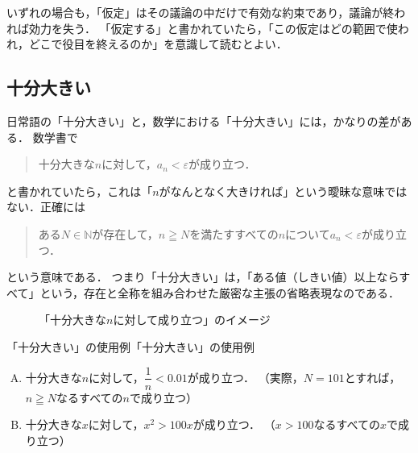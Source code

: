 いずれの場合も，「仮定」はその議論の中だけで有効な約束であり，議論が終われば効力を失う．
「仮定する」と書かれていたら，「この仮定はどの範囲で使われ，どこで役目を終えるのか」を意識して読むとよい．

\subsection{十分大きい}

日常語の「十分大きい」と，数学における「十分大きい」には，かなりの差がある．
数学書で
\begin{quote}
  十分大きな$n$に対して，$a_n < \varepsilon$が成り立つ．
\end{quote}
と書かれていたら，これは「$n$がなんとなく大きければ」という曖昧な意味ではない．正確には
\begin{quote}
  ある$N \in \mathbb{N}$が存在して，$n \geqq N$を満たすすべての$n$について$a_n < \varepsilon$が成り立つ．
\end{quote}
という意味である．
つまり「十分大きい」は，「ある値（しきい値）以上ならすべて」という，存在と全称を組み合わせた厳密な主張の省略表現なのである．

\begin{figure}[htbp]
  \centering
  \caption{「十分大きな$n$に対して成り立つ」のイメージ}
  \label{fig:十分大きいのイメージ}
\end{figure}

\begin{example}{「十分大きい」の使用例}{「十分大きい」の使用例}
  \begin{enumerate}[(A)]
    \item 十分大きな$n$に対して，$\dfrac{1}{n} < 0.01$が成り立つ．
    （実際，$N=101$とすれば，$n \geqq N$なるすべての$n$で成り立つ）
    \item 十分大きな$x$に対して，$x^2 > 100x$が成り立つ．
    （$x > 100$なるすべての$x$で成り立つ）
  \end{enumerate}
\end{example}

